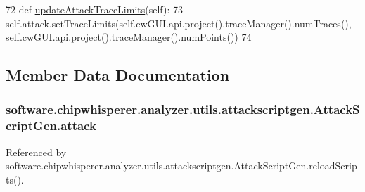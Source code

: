 \begin{DoxyCode}
72     \textcolor{keyword}{def }\hyperlink{classsoftware_1_1chipwhisperer_1_1analyzer_1_1utils_1_1attackscriptgen_1_1AttackScriptGen_ad174a61a310ea81c650291d48ef9da45}{updateAttackTraceLimits}(self):
73         self.attack.setTraceLimits(self.cwGUI.api.project().traceManager().numTraces(), 
      self.cwGUI.api.project().traceManager().numPoints())
74 
\end{DoxyCode}


\subsection{Member Data Documentation}
\hypertarget{classsoftware_1_1chipwhisperer_1_1analyzer_1_1utils_1_1attackscriptgen_1_1AttackScriptGen_a89227b42af2b2b07eebce4ac962554cb}{}
\subsubsection[{attack}]{\setlength{\rightskip}{0pt plus 5cm}software.\+chipwhisperer.\+analyzer.\+utils.\+attackscriptgen.\+Attack\+Script\+Gen.\+attack}\label{classsoftware_1_1chipwhisperer_1_1analyzer_1_1utils_1_1attackscriptgen_1_1AttackScriptGen_a89227b42af2b2b07eebce4ac962554cb}


Referenced by software.\+chipwhisperer.\+analyzer.\+utils.\+attackscriptgen.\+Attack\+Script\+Gen.\+reload\+Scripts().

\hypertarget{classsoftware_1_1chipwhisperer_1_1analyzer_1_1utils_1_1attackscriptgen_1_1AttackScriptGen_a04ff4c80a9cd093de03afe897cfb1937}{}

